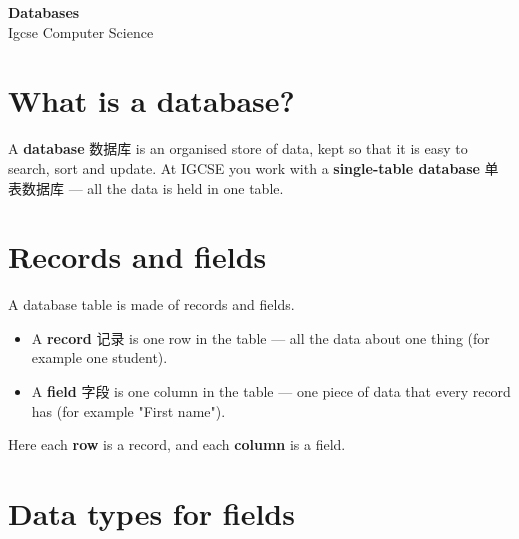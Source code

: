 \documentclass[11pt]{article}
\begin{document}
\begin{center}
  {\LARGE\bfseries Databases}\\[0.35em]
  {\large Igcse Computer Science}
\end{center}
\vspace{0.6em}

\section*{What is a database?}

A \textbf{database} 数据库 is an organised store of data, kept so that it is easy to search, sort and update. At IGCSE you work with a \textbf{single-table database} 单表数据库 — all the data is held in one table.

\section*{Records and fields}

A database table is made of records and fields.

\begin{itemize}
\item A \textbf{record} 记录 is one row in the table — all the data about one thing (for example one student).

\item A \textbf{field} 字段 is one column in the table — one piece of data that every record has (for example "First name").

\end{itemize}

\begin{center}
\end{center}

Here each \textbf{row} is a record, and each \textbf{column} is a field.

\section*{Data types for fields}
\end{document}
